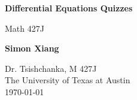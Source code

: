 \documentclass{article}
\begin{document}
\begin{titlepage}
    \begin{center}
        \vspace*{1cm}
 
        \Huge
        \textbf{Differential Equations Quizzes}
 
        \vspace{0.5cm}
        \LARGE
        Math 427J

        \vspace{1.5cm}
 
        \textbf{Simon Xiang}
 
        \vfill
  
        \vspace{0.8cm}
 
        \Large
    	Dr. Tsishchanka, M 427J\\
        The University of Texas at Austin\\
        \today
 
    \end{center}
\end{titlepage}
    
\end{document}
